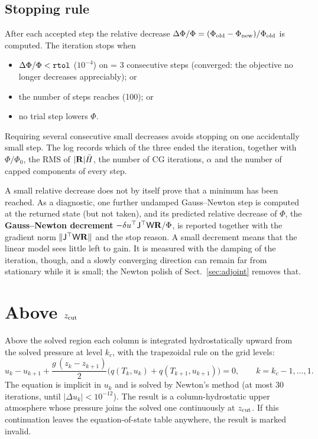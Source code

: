 \subsection{Stopping rule}\label{sec:stop}
After each accepted step the relative decrease $\Delta\Phi/\Phi=(\Phi_{\rm old}-\Phi_{\rm new})/\Phi_{\rm old}$ is computed.
The iteration stops when
\begin{itemize}
\item $\Delta\Phi/\Phi<\texttt{rtol}$ ($10^{-4}$) on  = 3 consecutive steps (converged: the objective no longer
decreases appreciably); or
\item the number of steps reaches  (100); or
\item no trial step lowers $\Phi$.
\end{itemize}
Requiring several consecutive small decreases avoids stopping on one accidentally small step. The log records which of the
three ended the iteration, together with $\Phi/\Phi_0$, the RMS of $|\mathbf R|\bar H$, the number of CG iterations, $\alpha$ and the
number of capped components of every step.

A small relative decrease does not by itself prove that a minimum has been reached. As a diagnostic, one further undamped
Gauss--Newton step is computed at the returned state (but not taken), and its predicted relative decrease of $\Phi$, the
\textbf{Gauss--Newton decrement} $-\delta u^{\top}\mathsf J^{\top}\mathsf W\mathbf R/\Phi$, is reported together with the gradient
norm $\|\mathsf J^{\top}\mathsf W\mathbf R\|$ and the stop reason. A small decrement means that the linear model sees little left to
gain. It is measured with the damping of the iteration, though, and a slowly converging direction can remain far from
stationary while it is small; the Newton polish of Sect.~\ref{sec:adjoint} removes that.

\section{\texorpdfstring{Above $z_{\rm cut}$}{Above z\_cut}}\label{sec:above}
Above the solved region each column is integrated hydrostatically upward from the solved pressure at level $k_c$, with the
trapezoidal rule on the grid levels:
\begin{equation}
u_{k}-u_{k+1}+\frac{g\,(z_k-z_{k+1})}{2}\big(q(T_k,u_k)+q(T_{k+1},u_{k+1})\big)=0,\qquad k=k_c-1,\dots,1 .
\end{equation}
The equation is implicit in $u_k$ and is solved by Newton's method (at most 30 iterations, until $|\Delta u_k|<10^{-12}$). The
result is a column-hydrostatic upper atmosphere whose pressure joins the solved one continuously at $z_{\rm cut}$. If this
continuation leaves the equation-of-state table anywhere, the result is marked invalid.

